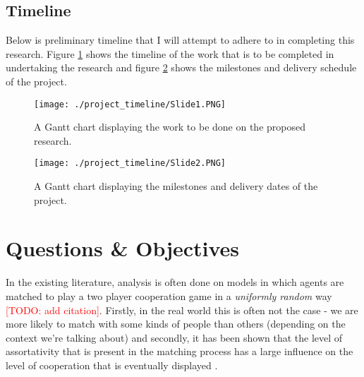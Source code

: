 \documentclass[11pt]{article}
\newcommand{\todo}[1]{\textcolor{red}{[TODO: #1]}\PackageWarning{TODO:}{#1!}}
\begin{document}
\subsection{Timeline}
Below is preliminary timeline that I will attempt to adhere to in completing
this research. Figure \ref{fig:main_gantt} shows the timeline of the work that
is to be completed in undertaking the research and figure
\ref{fig:delivery_gantt} shows the milestones and delivery schedule of the
project.
\begin{figure}[!htb]
	\texttt{[image: ./project\_timeline/Slide1.PNG]}
	\caption{A Gantt chart displaying the work to be done on the proposed research.}
	\label{fig:main_gantt}
\end{figure}
\begin{figure}[!htb]
	\texttt{[image: ./project\_timeline/Slide2.PNG]}
	\caption{A Gantt chart displaying the milestones and delivery dates of the project.}
	\label{fig:delivery_gantt}
\end{figure}
\section{Questions \& Objectives}
In the existing literature, analysis is often done on models in which agents
are matched to play a two player cooperation game in a \textit{uniformly
random} way \todo{add citation}. Firstly, in the real world this is often not
the case - we are more likely to match with some kinds of people than others
(depending on the context we're talking about) and secondly, it has been shown
that the level of assortativity that is present in the matching process has a
large influence on the level of cooperation that is eventually
displayed \cite{alger_homo_2013}.
\end{document}
